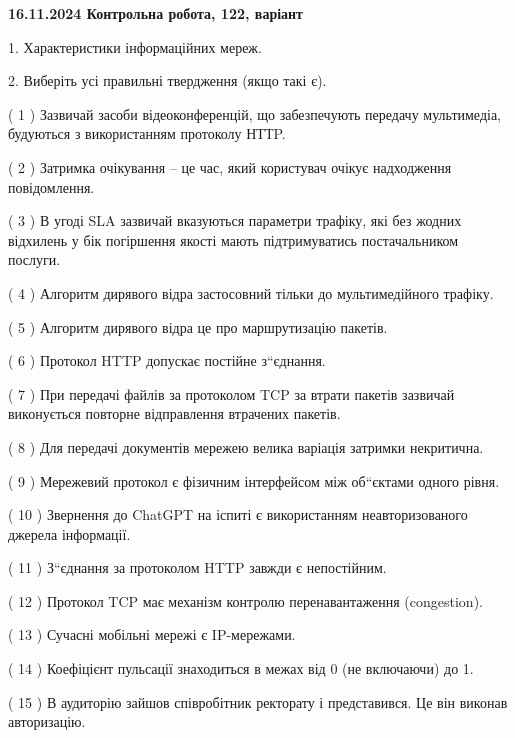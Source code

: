 \documentclass[12pt, ukrainian]{article}
\begin{document}
\vspace{4mm}
\newpage
\begin {large}

\textbf{16.11.2024 Контрольна робота, 122, варіант  }\par


{
1. Характеристики інформаційних мереж.



\vspace{5mm}
2. Виберіть усі правильні твердження (якщо такі є).\par
\vspace{2mm}

( 1 ) Зазвичай засоби відеоконференцій, що забезпечують передачу мультимедіа, будуються з використанням протоколу НТТP.

( 2 ) Затримка очікування – це час, який користувач очікує надходження повідомлення.

( 3 ) В угоді SLA зазвичай вказуються параметри трафіку, які без жодних відхилень у бік погіршення якості мають підтримуватись постачальником послуги.

( 4 ) Алгоритм дирявого відра застосовний тільки до мультимедійного трафіку.

( 5 ) Алгоритм дирявого відра це про маршрутизацію пакетів.

( 6 ) Протокол  HTTP допускає постійне з“єднання.

( 7 ) При передачі файлів за протоколом TCP за втрати пакетів зазвичай виконується повторне відправлення втрачених пакетів.

( 8 ) Для передачі документів мережею велика варіація затримки некритична.

( 9 ) Мережевий протокол є фізичним інтерфейсом між об“єктами одного рівня.

( 10 ) Звернення до ChatGPT на іспиті є використанням неавторизованого джерела інформації.

( 11 ) З“єднання за протоколом  HTTP завжди є непостійним.

( 12 ) Протокол TCP має механізм контролю перенавантаження (congestion).

( 13 ) Сучасні мобільні мережі є IP-мережами.

( 14 ) Коефіцієнт пульсації знаходиться в межах від 0 (не включаючи) до 1.

( 15 ) В аудиторію зайшов співробітник ректорату і представився. Це він виконав авторизацію.
}
\end {large}
\end{document}

